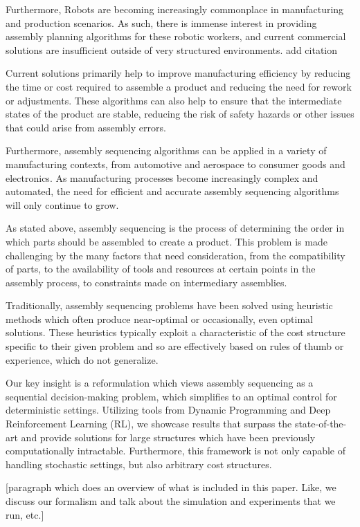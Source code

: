 \documentclass{article}
\begin{document}
Furthermore, Robots are becoming increasingly commonplace in manufacturing and production scenarios. As such, there is immense interest in providing assembly planning algorithms for these robotic workers, and current commercial solutions are insufficient outside of very structured environments. {\color{red} add citation}  

Current solutions primarily help to improve manufacturing efficiency by reducing the time or cost required to assemble a product and reducing the need for rework or adjustments. These algorithms can also help to ensure that the intermediate states of the product are stable, reducing the risk of safety hazards or other issues that could arise from assembly errors.

Furthermore, assembly sequencing algorithms can be applied in a variety of manufacturing contexts, from automotive and aerospace to consumer goods and electronics. As manufacturing processes become increasingly complex and automated, the need for efficient and accurate assembly sequencing algorithms will only continue to grow.

As stated above, assembly sequencing is the process of determining the order in which parts should be assembled to create a product. This problem is made challenging by the many factors that need consideration, from the compatibility of parts, to the availability of tools and resources at certain points in the assembly process, to constraints made on intermediary assemblies.

Traditionally, assembly sequencing problems have been solved using heuristic methods which often produce near-optimal or occasionally, even optimal solutions. These heuristics typically exploit a characteristic of the cost structure specific to their given problem and so are effectively based on rules of thumb or experience, which do not generalize.

Our key insight is a reformulation which views assembly sequencing as a sequential decision-making problem, which simplifies to an optimal control for deterministic settings. Utilizing tools from Dynamic Programming and Deep Reinforcement Learning (RL), we showcase results that surpass the state-of-the-art and provide solutions for large structures which have been previously computationally intractable. Furthermore, this framework is not only capable of handling stochastic settings, but also arbitrary cost structures. 

\color{red}
[paragraph which does an overview of what is included in this paper. Like, we discuss our formalism and talk about the simulation and experiments that we run, etc.]
\end{document}
